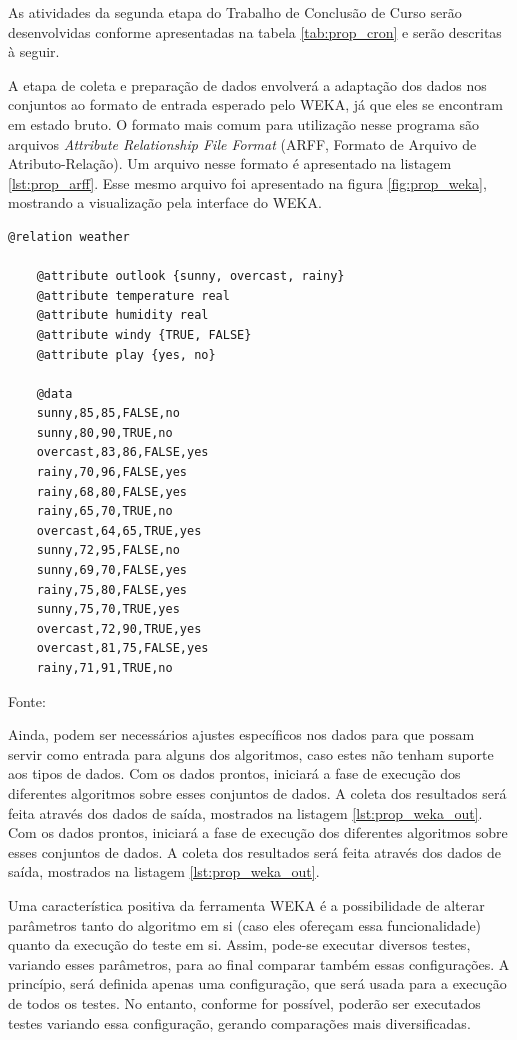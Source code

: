 As atividades da segunda etapa do Trabalho de Conclusão de Curso serão desenvolvidas conforme apresentadas na tabela \ref{tab:prop_cron} e serão descritas à seguir.

A etapa de coleta e preparação de dados envolverá a adaptação dos dados nos conjuntos ao formato de entrada esperado pelo WEKA, já que eles se encontram em estado bruto. O formato mais comum para utilização nesse programa são arquivos \emph{Attribute Relationship File Format} (ARFF, Formato de Arquivo de Atributo-Relação). Um arquivo nesse formato é apresentado na listagem \ref{lst:prop_arff}. Esse mesmo arquivo foi apresentado na figura \ref{fig:prop_weka}, mostrando a visualização pela interface do WEKA.

\vspace{0.5cm}
\begin{lstlisting}[caption=Exemplo de arquivo no formato ARFF, label=lst:prop_arff]
    @relation weather

    @attribute outlook {sunny, overcast, rainy}
    @attribute temperature real
    @attribute humidity real
    @attribute windy {TRUE, FALSE}
    @attribute play {yes, no}

    @data
    sunny,85,85,FALSE,no
    sunny,80,90,TRUE,no
    overcast,83,86,FALSE,yes
    rainy,70,96,FALSE,yes
    rainy,68,80,FALSE,yes
    rainy,65,70,TRUE,no
    overcast,64,65,TRUE,yes
    sunny,72,95,FALSE,no
    sunny,69,70,FALSE,yes
    rainy,75,80,FALSE,yes
    sunny,75,70,TRUE,yes
    overcast,72,90,TRUE,yes
    overcast,81,75,FALSE,yes
    rainy,71,91,TRUE,no
\end{lstlisting}
\vspace{0.25cm}
\centerline{Fonte: \cite{Hall2009}}
\vspace{0.5cm}

Ainda, podem ser necessários ajustes específicos nos dados para que possam servir como entrada para alguns dos algoritmos, caso estes não tenham suporte aos tipos de dados. Com os dados prontos, iniciará a fase de execução dos diferentes algoritmos sobre esses conjuntos de dados. A coleta dos resultados será feita através dos dados de saída, mostrados na listagem \ref{lst:prop_weka_out}. Com os dados prontos, iniciará a fase de execução dos diferentes algoritmos sobre esses conjuntos de dados. A coleta dos resultados será feita através dos dados de saída, mostrados na listagem \ref{lst:prop_weka_out}.

Uma característica positiva da ferramenta WEKA é a possibilidade de alterar parâmetros tanto do algoritmo em si (caso eles ofereçam essa funcionalidade) quanto da execução do teste em si. Assim, pode-se executar diversos testes, variando esses parâmetros, para ao final comparar também essas configurações. A princípio, será definida apenas uma configuração, que será usada para a execução de todos os testes. No entanto, conforme for possível, poderão ser executados testes variando essa configuração, gerando comparações mais diversificadas.

